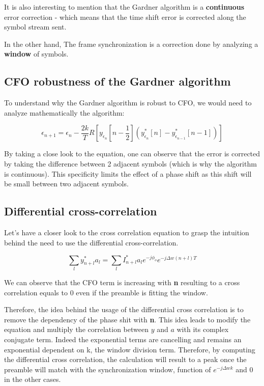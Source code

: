 It is also interesting to mention that the Gardner algorithm is a \textbf{continuous} error correction - which means that
the time shift error is corrected along the symbol stream sent.\par
In the other hand, The frame synchronization is a correction done by analyzing a \textbf{window} of symbols.

\subsection{CFO robustness of the Gardner algorithm}

To understand why the Gardner algorithm is robust to CFO, we would need to analyze mathematically the algorithm:

\begin{equation*}
    \epsilon_{n+1} = \epsilon_{n} - \frac{2k}{T} R[y_{\epsilon_{n}}[n-\frac{1}{2}](y_{\epsilon_{n}}^{*}[n] - y_{\epsilon_{n-1}}^{*}[n-1])]
\end{equation*}

By taking a close look to the equation, one can observe that the error is corrected by taking the difference between 2 adjacent symbols (which is why the algorithm is
continuous). This specificity limits the effect of a phase shift as this shift will be small between two adjacent symbols.

\subsection{Differential cross-correlation}

Let's have a closer look to the cross correlation equation to grasp the intuition behind the need to use the differential cross-correlation.

\begin{equation*}
    \sum_{l}{y^{*}_{n+l}a_{l}} = \sum_{l}{I^{*}_{n+l}a_{l}e^{-j\phi_{o}}e^{-j\Delta w(n+l)T}}
\end{equation*}

We can observe that the CFO term is increasing with \textbf{n} resulting to a cross correlation equals to 0 even if the preamble is fitting
the window.

Therefore, the idea behind the usage of the differential cross correlation is to remove the dependency of the phase shit with \textbf{n}.
This idea leads to modify the equation and multiply the correlation between $y$ and $a$ with its complex conjugate term. Indeed the exponential 
terms are cancelling and remains an exponential dependent on k, the window division term.
Therefore, by computing the differential cross correlation, the calculation will result to a peak once the preamble will match with the synchronization
 window, function of $e^{-j\Delta wk}$ and 0 in the other cases.
 
